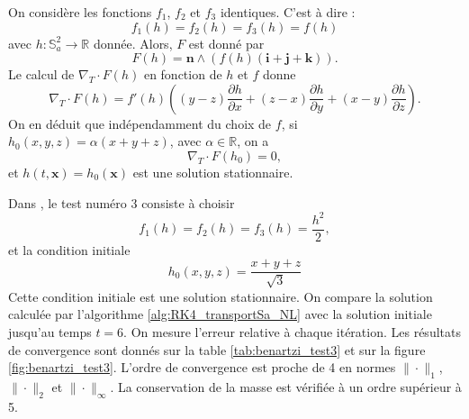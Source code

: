 On considère les fonctions $f_1$, $f_2$ et $f_3$ identiques. C'est à dire :
\begin{equation}
f_1(h) = f_2(h) = f_3(h) = f(h)
\end{equation}
avec $h : \mathbb{S}_a^2 \rightarrow \mathbb{R}$ donnée.
Alors, $F$ est donné par
\begin{equation}
F(h) = \mathbf{n} \wedge \left( f(h) (\mathbf{i}+\mathbf{j}+\mathbf{k}) \right).
\end{equation}
Le calcul de $\nabla_T \cdot F(h)$ en fonction de $h$ et $f$ donne
\begin{equation}
\nabla_T \cdot F(h) = f'(h) \left( (y-z)\dfrac{\partial h}{\partial x} + (z-x)\dfrac{\partial h}{\partial y} + (x-y)\dfrac{\partial h}{\partial z} \right).
\end{equation}
On en déduit que indépendamment du choix de $f$, si $h_0(x,y,z) = \alpha (x+y+z)$, avec $\alpha \in \mathbb{R}$, on a
\begin{equation}
\nabla_T \cdot F(h_0) = 0,
\end{equation}
et $h(t,\mathbf{x}) = h_0(\mathbf{x})$ est une solution stationnaire.

Dans \cite{BenArtzi2009}, le test numéro 3 consiste à choisir
\begin{equation}
f_1(h) = f_2(h) = f_3(h) = \dfrac{h^2}{2},
\end{equation}
et la condition initiale 
\begin{equation}
h_0(x,y,z) = \dfrac{x+y+z}{\sqrt{3}}
\end{equation}
Cette condition initiale est une solution stationnaire. On compare la solution calculée par l'algorithme \ref{alg:RK4_transportSa_NL} avec la solution initiale jusqu'au temps $t=6$. On mesure l'erreur relative à chaque itération. Les résultats de convergence sont donnés sur la table \ref{tab:benartzi_test3} et sur la figure \ref{fig:benartzi_test3}. L'ordre de convergence est proche de 4 en normes $\| \cdot \|_1$, $\| \cdot \|_2$ et $\| \cdot \|_{\infty}$. La conservation de la masse est vérifiée à un ordre supérieur à 5.

